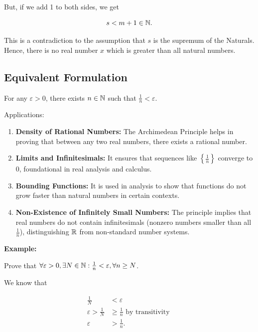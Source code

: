 But, if we add 1 to both sides, we get

\[
	s < m + 1 \in \mathbb{N}.
\]

This is a contradiction to the assumption that \(s\) is the supremum of the Naturals. Hence, there
is no real number \(x\) which is greater than all natural numbers.

\QED

\subsection{Equivalent Formulation}

For any \( \varepsilon > 0 \), there exists \( n \in \mathbb{N} \) such that \( \frac{1}{n} < \varepsilon \).

Applications:

\begin{enumerate}

	\item \textbf{Density of Rational Numbers:} The Archimedean Principle helps in proving that between
	      any two real numbers, there exists a rational number.

	\item \textbf{Limits and Infinitesimals:} It ensures that sequences like
	      \( \left\{ \frac{1}{n} \right\}\) converge to 0, foundational in real analysis and calculus.

	\item \textbf{Bounding Functions:} It is used in analysis to show that functions do not grow faster
	      than natural numbers in certain contexts.

	\item \textbf{Non-Existence of Infinitely Small Numbers:} The principle implies that real numbers do
	      not contain infinitesimals (nonzero numbers smaller than all \( \frac{1}{n} \)), distinguishing
	      \( \mathbb{R} \) from non-standard number systems.

\end{enumerate}

\textbf{Example:}

Prove that \(\forall \varepsilon > 0, \exists N \in \mathbb{N}: \frac{1}{n} < \varepsilon, \forall n \ge N\).

We know that

\begin{align*}
	\frac{1}{N}               & < \varepsilon                            \\
	\varepsilon > \frac{1}{N} & \ge \frac{1}{n} \text{ by transitivity } \\
	\varepsilon               & > \frac{1}{n}.
\end{align*}

